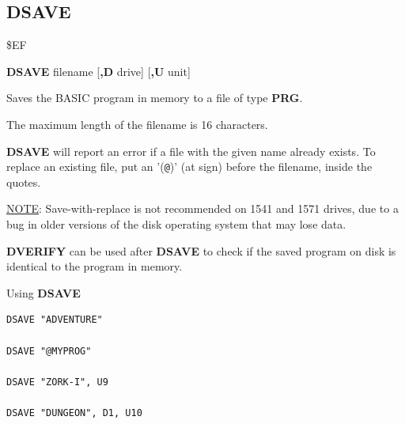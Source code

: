 \subsection{DSAVE}
\begin{description}[leftmargin=2cm,style=nextline]
\item [Token:]    \$EF

\item [Format:]   {\bf DSAVE} filename [{\bf,D} drive] [{\bf,U} unit]

\item [Usage:]    Saves the BASIC program in memory to a file of type {\bf PRG}.

                  \filenamedefinition

                  The maximum length of the filename is 16 characters.

                  {\bf DSAVE} will report an error if a file with the given name already exists. To replace an existing file, put an '(\texttt{@})' (at sign) before the filename, inside the quotes.

                  \underline{NOTE}: Save-with-replace is not recommended on 1541 and 1571 drives, due to a bug in older versions of the disk operating system that may lose data.

                  \drivedefinition

                  \unitdefinition

\item [Remarks:]  {\bf DVERIFY} can be used after {\bf DSAVE} to check if the saved program on disk is identical to the program
   in memory.

\item [Examples:] Using {\bf DSAVE}

\begin{tcolorbox}[colback=black,coltext=white]
\verbatimfont{\codefont}
\begin{verbatim}
DSAVE "ADVENTURE"

DSAVE "@MYPROG"

DSAVE "ZORK-I", U9

DSAVE "DUNGEON", D1, U10
\end{verbatim}
\end{tcolorbox}
\end{description}


\newpage
